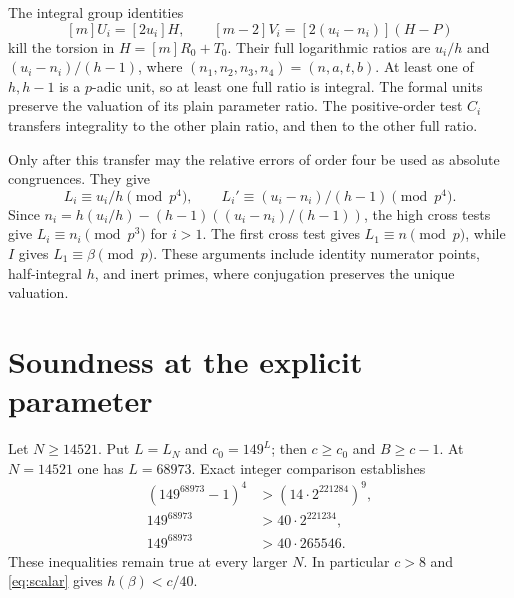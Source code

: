 \documentclass[11pt,a4paper]{article}
\begin{document}
The integral group identities
\[
                  [m]U_i=[2u_i]H,\qquad
                  [m-2]V_i=[2(u_i-n_i)](H-P)
\]
kill the torsion in $H=[m]R_0+T_0$. Their full logarithmic ratios
are $u_i/h$ and $(u_i-n_i)/(h-1)$, where
$(n_1,n_2,n_3,n_4)=(n,a,t,b)$. At least one of $h,h-1$ is a
$p$-adic unit, so at least one full ratio is integral. The formal
units preserve the valuation of its plain parameter ratio.
The positive-order test $C_i$ transfers integrality to the other
plain ratio, and then to the other full ratio.

Only after this transfer may the relative errors of order four
be used as absolute congruences. They give
\[
 L_i\equiv u_i/h\pmod{p^4},\qquad
 L_i'\equiv(u_i-n_i)/(h-1)\pmod{p^4}.
\]
Since $n_i=h(u_i/h)-(h-1)((u_i-n_i)/(h-1))$, the high cross tests
give $L_i\equiv n_i\pmod{p^3}$ for $i>1$. The first cross test
gives $L_1\equiv n\pmod p$, while $I$ gives $L_1\equiv\beta\pmod p$.
These arguments include identity numerator points, half-integral $h$,
and inert primes, where conjugation preserves the unique valuation.

\section{Soundness at the explicit parameter}\label{sec:soundness}
Let $N\ge14521$. Put $L=L_N$ and $c_0=149^L$; then $c\ge c_0$ and
$B\ge c-1$. At $N=14521$ one has $L=68973$. Exact integer comparison
establishes
\begin{equation}\label{eq:thresholds}
 \begin{split}
 (149^{68973}-1)^4&>(14\cdot2^{221284})^9,\\
 149^{68973}&>40\cdot2^{221234},\\
 149^{68973}&>40\cdot265546.
 \end{split}
\end{equation}
These inequalities remain true at every larger $N$.
In particular $c>8$ and \eqref{eq:scalar} gives $h(\beta)<c/40$.
\end{document}
